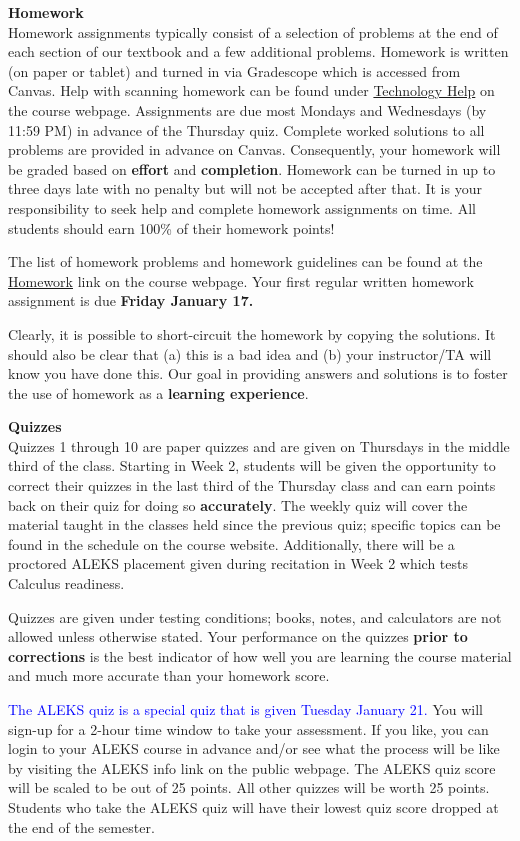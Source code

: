 \documentclass[12pt]{article}
\renewcommand{\emph}[1]{\textsf{\textbf{#1}}}
\newcommand{\localhead}[1]{\par\smallskip\textbf{#1}\nobreak\\}%
\def\heading#1{\localhead{\large\emph{#1}}}
\begin{document}
\heading{Homework}
Homework assignments typically consist of a selection of problems at
the end of each section of our textbook and a few additional
problems. Homework is written (on paper or tablet) and turned in via
Gradescope which is accessed from Canvas.  Help with scanning homework
can be found under
\href{https://uaf-math251.github.io/techHelp.html}{Technology Help} on
the course webpage. Assignments are due most Mondays and Wednesdays
(by 11:59 PM) in advance of the Thursday quiz. Complete worked
solutions to all problems are provided in advance on
Canvas. Consequently, your homework will be graded based on
\emph{effort} and \emph{completion}. Homework can be turned in up to
three days late with no penalty but will not be accepted after that.
It is your responsibility to seek help and complete homework
assignments on time.
 All students should earn
100\% of their homework points!

The list of homework problems and homework guidelines can be found at the \href{https://uaf-math251.github.io/newhomework.html}{Homework} link on the course webpage. Your first regular written homework assignment is due \emph{Friday January 17.}

Clearly, it is possible to short-circuit the homework by copying the solutions. It should also be clear that (a) this is a bad idea and (b) your instructor/TA will know you have done this. Our goal in providing answers and solutions is to foster the use of homework as a \emph{learning experience}. 



\heading{Quizzes}
Quizzes 1 through 10 are paper quizzes and are given on Thursdays in the middle third of the class. Starting in Week 2, students will be given the opportunity to correct their quizzes in the last third of the Thursday class and can earn points back on their quiz for doing so \emph{accurately}. The weekly quiz will cover the material taught in the classes held since the previous quiz; specific topics can be found in the schedule on the course website. Additionally, there will be a proctored ALEKS placement given during recitation in Week 2 which tests Calculus readiness.

Quizzes are given under testing conditions; books, notes, and calculators are not allowed unless otherwise stated. Your performance on the quizzes \emph{prior to corrections} is the best indicator of how well you are learning the course material and much more accurate than your homework score.

\textcolor{blue}{The ALEKS quiz is a special quiz that is given Tuesday January 21.} You will sign-up for a 2-hour time window to take your assessment. If you like, you can login to your ALEKS course in advance and/or see what the process will be like by visiting the ALEKS info link on the public webpage. The ALEKS quiz score will be scaled to be out of 25 points. All other quizzes will be worth 25 points. Students who take the ALEKS quiz will have their lowest quiz score dropped at the end of the semester.
\end{document}
